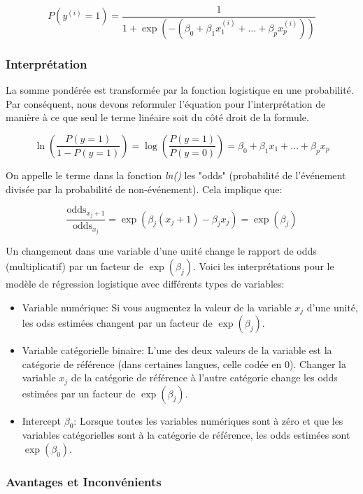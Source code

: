 \[
P(y^{(i)}=1)=\frac{1}{1+\exp(-(\beta_{0}+\beta_{1}x^{(i)}_{1}+\ldots+\beta_{p}x^{(i)}_{p}))}
\]

\subsubsection{Interprétation}

La somme pondérée est transformée par la fonction logistique en une probabilité. Par conséquent, nous devons reformuler l'équation pour l'interprétation de manière à ce que seul le terme linéaire soit du côté droit de la formule.

\[
\ln\left(\frac{P(y=1)}{1-P(y=1)}\right)=\log\left(\frac{P(y=1)}{P(y=0)}\right)=\beta_{0}+\beta_{1}x_{1}+\ldots+\beta_{p}x_{p}
\]

On appelle le terme dans la fonction \textit{ln()} les "odds" (probabilité de l'événement divisée par la probabilité de non-événement). Cela implique que:

\[
\frac{\text{odds}_{x_j+1}}{\text{odds}_{x_j}}=\exp\left(\beta_{j}(x_{j}+1)-\beta_{j}x_{j}\right)=\exp\left(\beta_j\right)
\]

Un changement dans une variable d'une unité change le rapport de odds (multiplicatif) par un facteur de \(\exp(\beta_j)\). Voici les interprétations pour le modèle de régression logistique avec différents types de variables:

\begin{itemize}
    \item Variable numérique: Si vous augmentez la valeur de la variable \(x_j\) d'une unité, les odss estimées changent par un facteur de \(\exp(\beta_j)\).
    \item Variable catégorielle binaire: L'une des deux valeurs de la variable est la catégorie de référence (dans certaines langues, celle codée en 0). Changer la variable \(x_j\) de la catégorie de référence à l'autre catégorie change les odds estimées par un facteur de \(\exp(\beta_j)\).
    \item Intercept \(\beta_0\): Lorsque toutes les variables numériques sont à zéro et que les variables catégorielles sont à la catégorie de référence, les odds estimées sont \(\exp(\beta_0)\).
\end{itemize}

\subsubsection{Avantages et Inconvénients}

